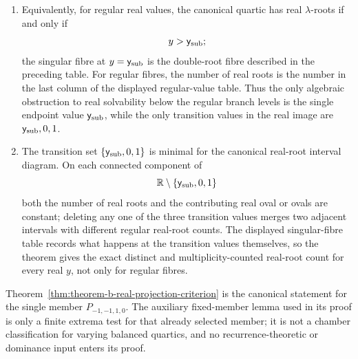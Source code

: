 \begin{theorem}
\begin{enumerate}
\[
\begin{array}{c|c|c|c}
y & \text{factorization data} & \#\{\text{distinct real roots}\} & \#\{\text{real roots with multiplicity}\}\\
\hline
\ySub & (\lambda-\alpha)^2Q(\lambda),\ Q\text{ real irreducible} & 1 & 2\\
0 & \lambda(\lambda+1)(\lambda-1)^2 & 3 & 4\\
1 & (\lambda-2)(\lambda-1)(\lambda+1)^2 & 3 & 4.
\end{array}
\]
The component decomposition behind this count is recorded in Corollary~\ref{cor:real-root-interval-diagram}.
\item Equivalently, for regular real values, the canonical quartic has real \(\lambda\)-roots if and only if
\[
y>\mathsf{y}_{\mathrm{sub}};
\]
the singular fibre at \(y=\mathsf{y}_{\mathrm{sub}}\) is the double-root fibre described in the preceding table.  For regular fibres, the number of real roots is the number in the last column of the displayed regular-value table.  Thus the only algebraic obstruction to real solvability below the regular branch levels is the single endpoint value \(\mathsf{y}_{\mathrm{sub}}\), while the only transition values in the real image are \(\mathsf{y}_{\mathrm{sub}},0,1\).
\item The transition set \(\{\mathsf{y}_{\mathrm{sub}},0,1\}\) is minimal for the canonical real-root interval diagram.  On each connected component of
\[
\mathbb{R}\setminus\{\mathsf{y}_{\mathrm{sub}},0,1\}
\]
both the number of real roots and the contributing real oval or ovals are constant; deleting any one of the three transition values merges two adjacent intervals with different regular real-root counts.  The displayed singular-fibre table records what happens at the transition values themselves, so the theorem gives the exact distinct and multiplicity-counted real-root count for every real \(y\), not only for regular fibres.
\end{enumerate}
\end{theorem}

\begin{remark}\label{rem:theorem-b-scope}
Theorem~\ref{thm:theorem-b-real-projection-criterion} is the canonical statement for the single member \(P_{-1,-1,1,0}\).  The auxiliary fixed-member lemma used in its proof is only a finite extrema test for that already selected member; it is not a chamber classification for varying balanced quartics, and no recurrence-theoretic or dominance input enters its proof.
\end{remark}

